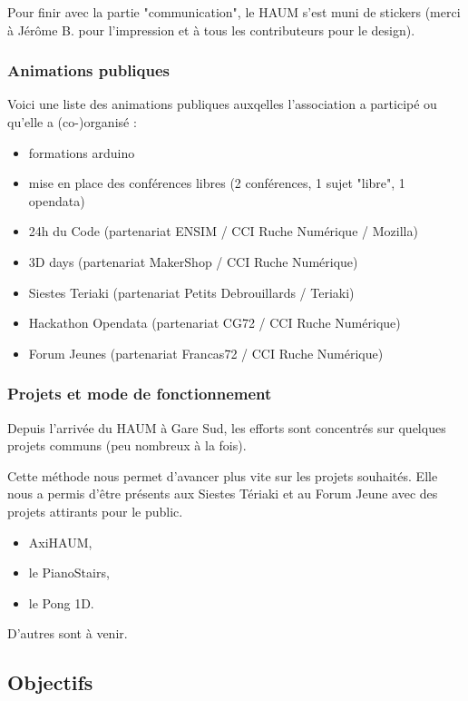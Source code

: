 \documentclass[a4paper, 11pt]{article}
\begin{document}
Pour finir avec la partie "communication", le HAUM s'est muni de stickers (merci à Jérôme B. pour l'impression et à tous les contributeurs pour le design).

\subsubsection{Animations publiques}

Voici une liste des animations publiques auxqelles l'association a participé ou qu'elle a (co-)organisé :

\begin{itemize}
    \item formations arduino
    \item mise en place des conférences libres (2 conférences, 1 sujet "libre", 1 opendata)
    \item 24h du Code (partenariat ENSIM / CCI Ruche Numérique / Mozilla)
    \item 3D days (partenariat MakerShop / CCI Ruche Numérique)
    \item Siestes Teriaki (partenariat Petits Debrouillards / Teriaki)
    \item Hackathon Opendata (partenariat CG72 / CCI Ruche Numérique)
    \item Forum Jeunes (partenariat Francas72 / CCI Ruche Numérique)
\end{itemize}

\subsubsection{Projets et mode de fonctionnement}

Depuis l'arrivée du HAUM à Gare Sud, les efforts sont concentrés sur quelques projets communs (peu nombreux à la fois).

Cette méthode nous permet d'avancer plus vite sur les projets souhaités. Elle nous a permis d'être présents aux Siestes Tériaki et au Forum Jeune avec des projets attirants pour le public. 
    
\begin{itemize}
    \item AxiHAUM,
    \item le PianoStairs,
    \item le Pong 1D.
\end{itemize}

D'autres sont à venir.

\subsection{Objectifs}
\end{document}
